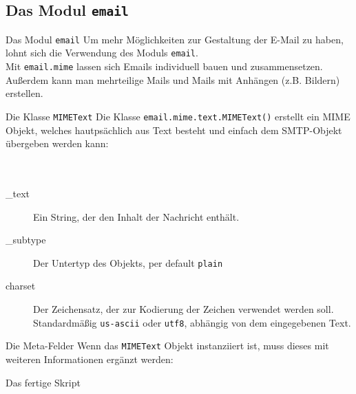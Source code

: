 \subsection{Das Modul \texttt{email}}
\begin{frame}[fragile]{Das Modul \texttt{email}}
	Um mehr Möglichkeiten zur Gestaltung der E-Mail zu haben, lohnt sich die Verwendung des Moduls \texttt{email}.\\[.5cm]
	Mit \texttt{email.mime} lassen sich Emails individuell bauen und zusammensetzen. Außerdem kann man mehrteilige Mails und Mails mit Anhängen (z.B. Bildern) erstellen.
\end{frame}

\begin{frame}[fragile]{Die Klasse \texttt{MIMEText}}
	Die Klasse \texttt{email.mime.text.MIMEText()} erstellt ein MIME Objekt, welches hautps\"achlich aus Text besteht und einfach dem SMTP-Objekt \"ubergeben werden kann: \\ \ \\
	 \ \\
	
	\begin{description}
		\item[\_text] Ein String, der den Inhalt der Nachricht enth\"alt.
		\item[\_subtype] Der Untertyp des Objekts, per default \texttt{plain}
		\item[charset] Der Zeichensatz, der zur Kodierung der Zeichen verwendet werden soll. Standardm\"a\ss{}ig \texttt{us-ascii} oder \texttt{utf8}, abh\"angig von dem eingegebenen Text.
	\end{description}
\end{frame}

\begin{frame}[fragile]{Die Meta-Felder}
	Wenn das \texttt{MIMEText} Objekt instanziiert ist, muss dieses mit weiteren Informationen erg\"anzt werden:
\end{frame}

\begin{frame}{Das fertige Skript}
	
\end{frame}


